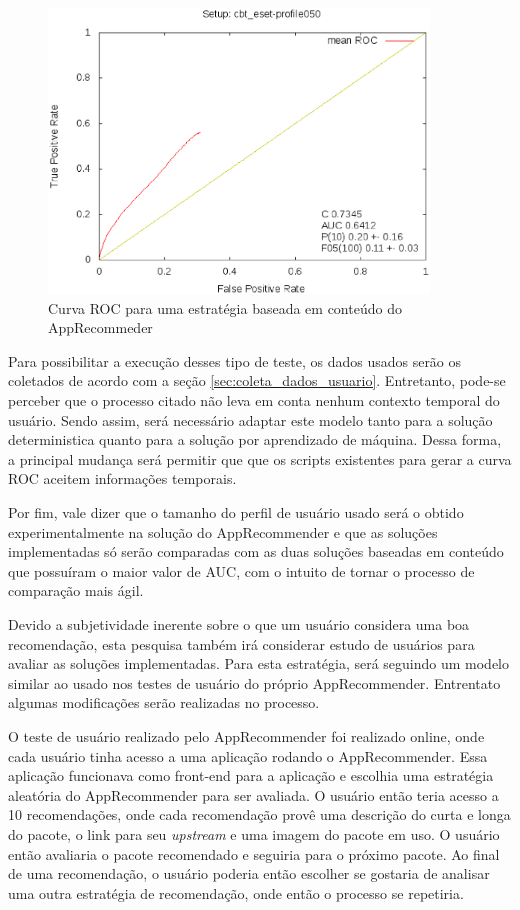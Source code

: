 \begin{figure}[h]
  \centering
  \includegraphics[width=0.9\textwidth]{figuras/roc_apprecommender.eps}
  \caption{Curva ROC para uma estratégia baseada em conteúdo do AppRecommeder}
  \label{fig:roc_apprecommender}
\end{figure}


Para possibilitar a execução desses tipo de teste, os dados usados serão os
coletados de acordo com a seção \ref{sec:coleta_dados_usuario}. Entretanto,
pode-se perceber que o processo citado não leva em conta nenhum contexto temporal
do usuário. Sendo assim, será necessário adaptar este modelo tanto para a
solução deterministica quanto para a solução por aprendizado de máquina. Dessa
forma, a principal mudança será permitir que que os scripts existentes para
gerar a curva ROC aceitem informações temporais.

Por fim, vale dizer que o tamanho do perfil de usuário usado será o obtido
experimentalmente na solução do AppRecommender e que as soluções implementadas
só serão comparadas com as duas soluções baseadas em conteúdo que possuíram o
maior valor de AUC, com o intuito de tornar o processo de comparação mais ágil.


Devido a subjetividade inerente sobre o que um usuário considera uma boa
recomendação, esta pesquisa também irá considerar estudo de usuários para
avaliar as soluções implementadas. Para esta estratégia, será seguindo um modelo
similar ao usado nos testes de usuário do próprio AppRecommender. Entrentato
algumas modificações serão realizadas no processo.

O teste de usuário realizado pelo AppRecommender foi realizado online, onde cada
usuário tinha acesso a uma aplicação rodando o AppRecommender. Essa aplicação
funcionava como front-end para a aplicação e escolhia uma estratégia aleatória
do AppRecommender para ser avaliada. O usuário então teria acesso a 10
recomendações, onde cada recomendação provê uma descrição do curta e longa do
pacote, o link para seu \textit{upstream} e uma imagem do pacote em uso. O
usuário então avaliaria o pacote recomendado e seguiria para o próximo pacote.
Ao final de uma recomendação, o usuário poderia então escolher se gostaria de
analisar uma outra estratégia de recomendação, onde então o processo se
repetiria.

